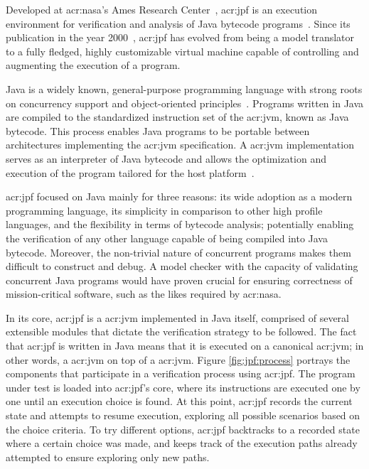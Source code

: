 
Developed at \acrshort{acr:nasa}'s Ames Research Center~\cite{WebNASAAmes2017}, \acrfull{acr:jpf} is an execution environment for verification and analysis of Java bytecode programs~\cite{Visser2003,WebJPF2017}. Since its publication in the year 2000~\cite{Havelund2000}, \acrshort{acr:jpf} has evolved from being a model translator to a fully fledged, highly customizable virtual machine capable of controlling and augmenting the execution of a program.

Java is a widely known, general-purpose programming language with strong roots on concurrency support and object-oriented principles~\cite{Gosling2014}. Programs written in Java are compiled to the standardized instruction set of the \acrfull{acr:jvm}, known as Java bytecode. This process enables Java programs to be portable between architectures implementing the \acrshort{acr:jvm} specification. A \acrshort{acr:jvm} implementation serves as an interpreter of Java bytecode and allows the optimization and execution of the program tailored for the host platform~\cite{Lindholm2014}.

\acrshort{acr:jpf} focused on Java mainly for three reasons: its wide adoption as a modern programming language, its simplicity in comparison to other high profile languages, and the flexibility in terms of bytecode analysis; potentially enabling the verification of any other language capable of being compiled into Java bytecode. Moreover, the non-trivial nature of concurrent programs makes them difficult to construct and debug. A model checker with the capacity of validating concurrent Java programs would have proven crucial for ensuring correctness of mission-critical software, such as the likes required by \acrshort{acr:nasa}.

In its core, \acrshort{acr:jpf} is a \acrlong{acr:jvm} implemented in Java itself, comprised of several extensible modules that dictate the verification strategy to be followed. The fact that \acrshort{acr:jpf} is written in Java means that it is executed on a canonical \acrshort{acr:jvm}; in other words, a \acrshort{acr:jvm} on top of a \acrshort{acr:jvm}. Figure \ref{fig:jpf:process} portrays the components that participate in a verification process using \acrshort{acr:jpf}. The program under test is loaded into \acrshort{acr:jpf}'s core, where its instructions are executed one by one until an execution choice is found. At this point, \acrshort{acr:jpf} records the current state and attempts to resume execution, exploring all possible scenarios based on the choice criteria. To try different options, \acrshort{acr:jpf} backtracks to a recorded state where a certain choice was made, and keeps track of the execution paths already attempted to ensure exploring only new paths. 

